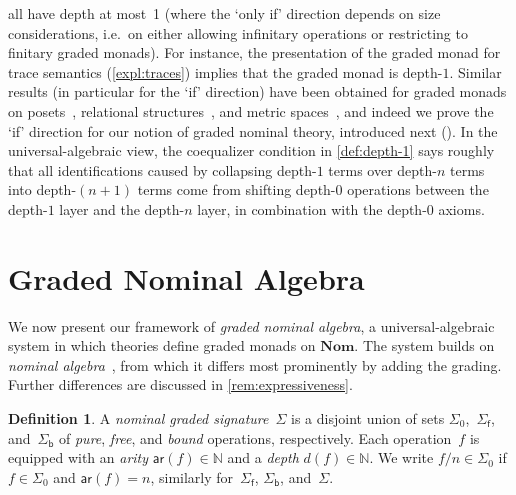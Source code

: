 \documentclass[a4paper,UKenglish,cleveref,thm-restate,numberwithinsect,final]{lipics-v2021}
\newcommand{\sigp}{\Sigma_0}
\newcommand{\sigf}{\Sigma_{\mathsf f}}
\newcommand{\sigb}{\Sigma_{\mathsf b}}
\newcommand{\ar}{\mathsf{ar}}
\theoremstyle{plain}
\numberwithin{equation}{section}
\newcommand{\Nat}{{\mathbb{N}}}
\newcommand{\+}[1]{\mathcal{#1}\xspace}
\newcommand{\Nom}{\mathbf{Nom}}
\theoremstyle{definition}
\newtheorem{defn}[theorem]{Definition}
\begin{document}
all have depth at most~1 \cite[Proposition~7.3]{MiliusEA15} (where the
`only if' direction depends on size considerations, i.e.~on either
allowing infinitary operations or restricting to finitary graded
monads). For instance, the presentation of the graded monad for trace
semantics (\cref{expl:traces}) implies that the graded monad is
depth-$1$. Similar results (in particular for the `if' direction) have
been obtained for graded monads on posets~\cite{FordEA21}, relational
structures~\cite{FordThesis}, and metric spaces~\cite{ForsterEA25a},
and indeed we prove the `if' direction for our notion of graded
nominal theory, introduced next (). In the
universal-algebraic view, the coequalizer condition in
\cref{def:depth-1} says roughly that all identifications caused by
collapsing depth-$1$ terms over depth-$n$ terms into depth-$(n+1)$
terms come from shifting depth-$0$ operations between the depth-$1$
layer and the depth-$n$ layer, in combination with the depth-$0$
axioms.

\section{Graded Nominal Algebra}\label{sec:graded-algebra}

\noindent We now present our framework of \emph{graded nominal
  algebra}, a universal-algebraic system in which theories define
graded monads on $\Nom$. The system builds on \emph{nominal
  algebra}~\cite{Gabbay09,GabbayMathijssen09}, from which it differs
most prominently by adding the grading.  Further differences are
discussed in \cref{rem:expressiveness}.

\begin{defn}
  A \emph{nominal graded signature}~\(\Sigma\) is a disjoint union of
  sets $\sigp$,~$\sigf$, and~$\sigb$ of \emph{pure}, \emph{free}, and
  \emph{bound} operations, respectively. Each operation~$f$ is
  equipped with an \emph{arity} \(\ar(f) \in \Nat\) and a \emph{depth}
  \(d(f) \in \Nat\).  We write \(f/n \in \sigp\) if \(f \in \sigp\)
  and \(\ar(f) = n\), similarly for~\(\sigf\), \(\sigb\),
  and~$\Sigma$.
\end{defn}
\end{document}
